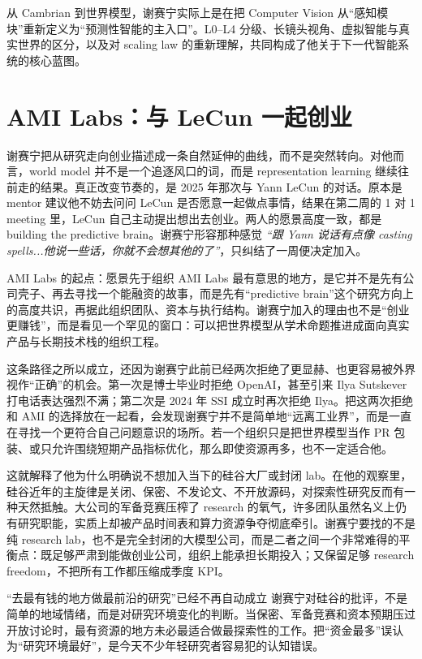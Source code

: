 \documentclass[a4paper,12pt]{article}
\begin{document}
从 Cambrian 到世界模型，谢赛宁实际上是在把 Computer Vision 从“感知模块”重新定义为“预测性智能的主入口”。L0--L4 分级、长镜头视角、虚拟智能与真实世界的区分，以及对 scaling law 的重新理解，共同构成了他关于下一代智能系统的核心蓝图。

\section{AMI Labs：与 LeCun 一起创业}

谢赛宁把从研究走向创业描述成一条自然延伸的曲线，而不是突然转向。对他而言，world model 并不是一个追逐风口的词，而是 representation learning 继续往前走的结果。真正改变节奏的，是 2025 年那次与 Yann LeCun 的对话。原本是 mentor 建议他不妨去问问 LeCun 是否愿意一起做点事情，结果在第二周的 1 对 1 meeting 里，LeCun 自己主动提出想出去创业。两人的愿景高度一致，都是 building the predictive brain。谢赛宁形容那种感觉 \textit{``跟 Yann 说话有点像 casting spells...他说一些话，你就不会想其他的了''}，只纠结了一周便决定加入。

\begin{importantbox}{AMI Labs 的起点：愿景先于组织}
AMI Labs 最有意思的地方，是它并不是先有公司壳子、再去寻找一个能融资的故事，而是先有“predictive brain”这个研究方向上的高度共识，再据此组织团队、资本与执行结构。谢赛宁加入的理由也不是“创业更赚钱”，而是看见一个罕见的窗口：可以把世界模型从学术命题推进成面向真实产品与长期技术栈的组织工程。
\end{importantbox}

这条路径之所以成立，还因为谢赛宁此前已经两次拒绝了更显赫、也更容易被外界视作“正确”的机会。第一次是博士毕业时拒绝 OpenAI，甚至引来 Ilya Sutskever 打电话表达强烈不满；第二次是 2024 年 SSI 成立时再次拒绝 Ilya。把这两次拒绝和 AMI 的选择放在一起看，会发现谢赛宁并不是简单地“远离工业界”，而是一直在寻找一个更符合自己问题意识的场所。若一个组织只是把世界模型当作 PR 包装、或只允许围绕短期产品指标优化，那么即使资源再多，也不一定适合他。

这就解释了他为什么明确说不想加入当下的硅谷大厂或封闭 lab。在他的观察里，硅谷近年的主旋律是关闭、保密、不发论文、不开放源码，对探索性研究反而有一种天然抵触。大公司的军备竞赛压榨了 research 的氧气，许多团队虽然名义上仍有研究职能，实质上却被产品时间表和算力资源争夺彻底牵引。谢赛宁要找的不是纯 research lab，也不是完全封闭的大模型公司，而是二者之间一个非常难得的平衡点：既足够严肃到能做创业公司，组织上能承担长期投入；又保留足够 research freedom，不把所有工作都压缩成季度 KPI。

\begin{warningbox}{“去最有钱的地方做最前沿的研究”已经不再自动成立}
谢赛宁对硅谷的批评，不是简单的地域情绪，而是对研究环境变化的判断。当保密、军备竞赛和资本预期压过开放讨论时，最有资源的地方未必最适合做最探索性的工作。把“资金最多”误认为“研究环境最好”，是今天不少年轻研究者容易犯的认知错误。
\end{warningbox}
\end{document}
